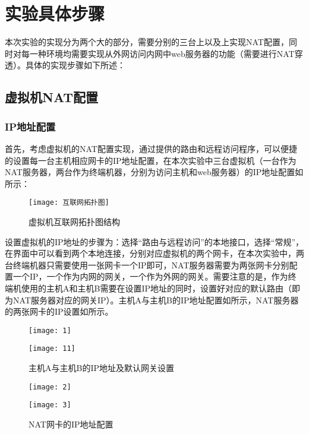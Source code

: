 \documentclass[lang=cn,11pt]{elegantpaper}
\begin{document}
\section{实验具体步骤}

本次实验的实现分为两个大的部分，需要分别的三台上以及上实现NAT配置，同时对每一种环境均需要实现从外网访问内网中web服务器的功能（需要进行NAT穿透）。具体的实现步骤如下所述：


\subsection{虚拟机NAT配置}
\subsubsection{IP地址配置}


首先，考虑虚拟机的NAT配置实现，通过提供的路由和远程访问程序，可以便捷的设置每一台主机相应网卡的IP地址配置，在本次实验中三台虚拟机（一台作为NAT服务器，两台作为终端机器，分别为访问主机和web服务器）的IP地址配置如所示：


\begin{figure}[htbp]
	\centering
	\texttt{[image: 互联网拓扑图]}
	\caption{虚拟机互联网拓扑图结构 \label{fig:tuopu}}
\end{figure}


设置虚拟机的IP地址的步骤为：选择“路由与远程访问”的本地接口，选择“常规”，在界面中可以看到两个本地连接，分别对应虚拟机的两个网卡，在本次实验中，两台终端机器只需要使用一张网卡一个IP即可，NAT服务器需要为两张网卡分别配置一个IP，一个作为内网的网关，一个作为外网的网关。需要注意的是，作为终端机使用的主机A和主机B需要在设置IP地址的同时，设置好对应的默认路由（即为NAT服务器对应的网关IP）。主机A与主机B的IP地址配置如所示，NAT服务器的两张网卡的IP设置如所示。

\begin{figure}[htbp]
	\begin{minipage}[t]{0.5\textwidth}
		\centering
		\texttt{[image: 1]}
	\end{minipage}
	\begin{minipage}[t]{0.5\textwidth}
		\centering
		\texttt{[image: 11]}
	\end{minipage}
		\caption{主机A与主机B的IP地址及默认网关设置 \label{fig:1}}
\end{figure}

\begin{figure}[htbp]
	\begin{minipage}[t]{0.5\textwidth}
		\centering
		\texttt{[image: 2]}
	\end{minipage}
	\begin{minipage}[t]{0.5\textwidth}
		\centering
		\texttt{[image: 3]}
	\end{minipage}
		\caption{NAT网卡的IP地址配置 \label{fig:2}}
\end{figure}
\end{document}
